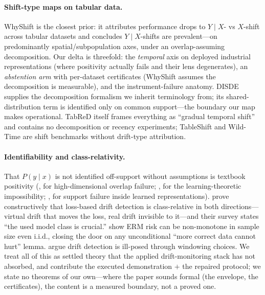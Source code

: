 \documentclass[10pt]{article} %
\begin{document}
\paragraph{Shift-type maps on tabular data.} WhyShift \citep{liu2023whyshift} is the closest prior: it
attributes performance drops to $Y \mid X$- vs $X$-shift across tabular datasets and concludes
$Y \mid X$-shifts are prevalent---on predominantly spatial/subpopulation axes, under an
overlap-assuming decomposition. Our delta is threefold: the \emph{temporal} axis on deployed
industrial representations (where positivity actually fails and their lens degenerates), an
\emph{abstention arm} with per-dataset certificates (WhyShift assumes the decomposition is
measurable), and the instrument-failure anatomy. DISDE \citep{cai2023disde} supplies the
decomposition formalism we inherit terminology from; its shared-distribution term is identified
only on common support---the boundary our map makes operational. TabReD itself
\citep{rubachev2025tabred} frames everything as ``gradual temporal shift'' and contains no
decomposition or recency experiments; TableShift \citep{gardner2023tableshift} and Wild-Time
\citep{yao2022wildtime} are shift benchmarks without drift-type attribution.

\paragraph{Identifiability and class-relativity.} That $P(y \mid x)$ is not identified off-support without
assumptions is textbook positivity (\citealp{damour2021overlap}, for high-dimensional overlap
failure; \citealp{bendavid2010impossibility}, for the learning-theoretic impossibility;
\citealp{johansson2019support}, for support failure inside learned representations).
\citet{hinder2023hardness} prove constructively that loss-based drift detection is class-relative
in both directions---virtual drift that moves the loss, real drift invisible to it---and their
survey \citep{hinder2024survey} states ``the used model class is crucial.'' \citet{loog2019minimizers}
show ERM risk can be non-monotone in sample size even i.i.d., closing the door on any
unconditional ``more correct data cannot hurt'' lemma. \citet{gowerwinter2026window} argue drift
detection is ill-posed through windowing choices. We treat all of this as settled theory that the
applied drift-monitoring stack has not absorbed, and contribute the executed demonstration $+$ the
repaired protocol; we state no theorems of our own---where the paper sounds formal (the
envelope, the certificates), the content is a measured boundary, not a proved one.
\end{document}

